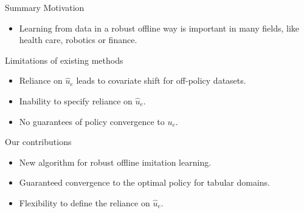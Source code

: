 \begin{block}{Summary}
\alert{Motivation}
\begin{itemize}
     \item Learning from data in a robust offline way is important in many fields, like health care, robotics or finance.
\end{itemize}
\alert{Limitations of existing  methods}
\begin{itemize}
    \item Reliance on $\hat{u}_e$ leads to covariate shift for off-policy datasets.
    \item Inability to specify reliance on $\hat{u}_e$.
    \item No guarantees of policy convergence to $u_e$.
\end{itemize}
\alert{Our contributions}
\begin{itemize}
     \item New algorithm for robust offline imitation learning.
     \item Guaranteed convergence to the optimal policy for tabular domains.
     \item Flexibility to define the reliance on $\hat{u}_e$.
\end{itemize}
\end{block}
